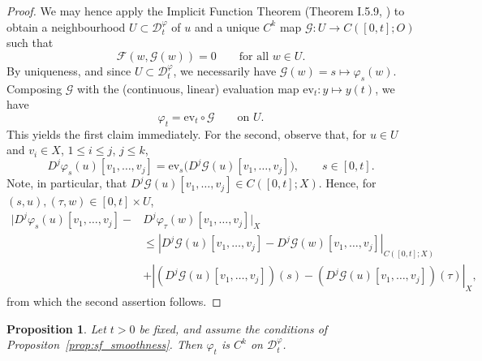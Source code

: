 \documentclass[a4paper, 12pt, oneside, reqno, notitlepage]{amsart}
\theoremstyle{plain}
\newtheorem{proposition}[theorem]{Proposition}
\theoremstyle{definition}
\theoremstyle{remark}
\begin{document}
\begin{proof}
    We may hence apply the Implicit Function Theorem (Theorem I.5.9, \cite{lang2012fundamentals}) to obtain a neighbourhood $U \subset  \mathcal{D}^\varphi_t$ of $u$ and a unique $C^k$ map $\mathcal{G}:U \to C([0,t];O)$ such that
    \begin{displaymath}
        \mathcal{F}(w, \mathcal{G}(w)) = 0 \qquad \text{for all }  w \in U.
    \end{displaymath}
    By uniqueness, and since $U \subset \mathcal{D}^\varphi_t$, 
    we necessarily have $\mathcal{G}(w) = s \mapsto \varphi_s(w)$.
    Composing $\mathcal{G}$ with the (continuous, linear) evaluation map $\mathrm{ev}_t : y \mapsto y(t)$, we have
    \begin{displaymath}
        \varphi_t = \mathrm{ev}_t \circ \mathcal{G} \qquad \text{on } U.
    \end{displaymath}
    This yields the first claim immediately.
    For the second, observe that, for $u \in U$ and $v_i \in X$, $1 \leq i \leq j $, $j \leq k$,
    \begin{displaymath}
        D^j\varphi_s(u)[v_1,\ldots,v_j] = \mathrm{ev}_s \big(  D^j \mathcal{G}(u)[v_1,\ldots,v_j]\big), \qquad s \in [0,t].
    \end{displaymath}
    Note, in particular, that $D^j \mathcal{G}(u)[v_1,\ldots,v_j]\in C([0,t];X)$.
    Hence, for $(s,u),(\tau,w) \in [0,t] \times U$,
    \begin{align*}
        \big| D^j\varphi_s(u)[v_1,\ldots,v_j] - &D^j\varphi_\tau(w)[v_1,\ldots,v_j] \big|_X  \\
        &\leq \left| D^j \mathcal{G}(u)[v_1,\ldots,v_j] - D^j \mathcal{G}(w)[v_1,\ldots,v_j] \right|_{C([0,t];X)} \\
        &+\left|  \left( D^j \mathcal{G}(u)[v_1,\ldots,v_j] \right)(s) - \left( D^j \mathcal{G}(u)[v_1,\ldots,v_j] \right)(\tau)  \right|_{X},
    \end{align*}
    from which the second assertion follows. 
\end{proof}


\begin{proposition}
    Let $t > 0$ be fixed, and assume the conditions of Propositon~\ref{prop:sf_smoothness}.
    Then $\varphi_t$ is $C^k$ on $\mathcal{D}_t^\varphi$. 
\end{proposition}
\end{document}
